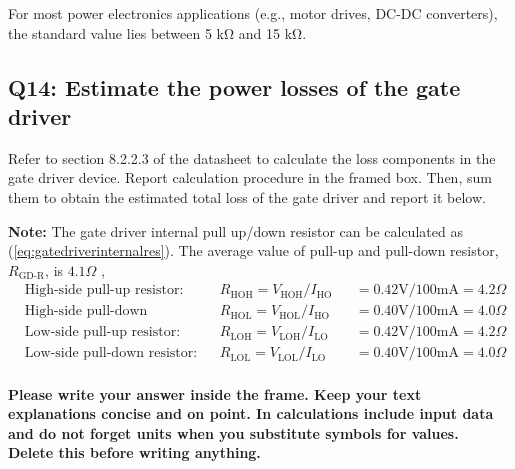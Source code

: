 \documentclass{PELsmallreport}
\begin{document}
For most power electronics applications (e.g., motor drives, DC-DC converters), the standard value lies between 5 kΩ and 15 kΩ. \\

 \quad {}\hfill{}

\subsection{Q14: Estimate the power losses of the gate driver}
Refer to section 8.2.2.3 of the datasheet to calculate the loss components in the gate driver device. Report calculation procedure in the framed box. Then, sum them to obtain the estimated total loss of the gate driver and report it below. 

\textbf{Note:} The gate driver internal pull up/down resistor can be calculated as (\ref{eq:gatedriverinternalres}). The average value of pull-up and pull-down resistor,$R_\text{GD-R}$, is $4.1 \Omega$ ,
\begin{equation}
    \begin{split}
        &\text{High-side pull-up resistor:}\quad &&R_\text{HOH} = V_\text{HOH}/I_\text{HO} &&= 0.42\text{V}/100\text{mA} = 4.2 \Omega\\
        &\text{High-side pull-down resistor:}\quad &&R_\text{HOL} = V_\text{HOL}/I_\text{HO}&&= 0.40\text{V}/100\text{mA} = 4.0 \Omega\\
        &\text{Low-side pull-up resistor:}\quad &&R_\text{LOH} = V_\text{LOH}/I_\text{LO}&&= 0.42\text{V}/100\text{mA} = 4.2 \Omega\\
        &\text{Low-side pull-down resistor:}\quad &&R_\text{LOL} = V_\text{LOL}/I_\text{LO}&&= 0.40\text{V}/100\text{mA} = 4.0 \Omega\\
    \end{split}
    \label{eq:gatedriverinternalres}
\end{equation}


\begin{framed}
	\vspace{2em}
	\textbf{Please write your answer inside the frame. Keep your text explanations concise and on point. In calculations include input data and do not forget units when you substitute symbols for values. \\ Delete this before writing anything.}
	\vspace{2em}
\end{framed}
 \quad \hfill{}
\end{document}
